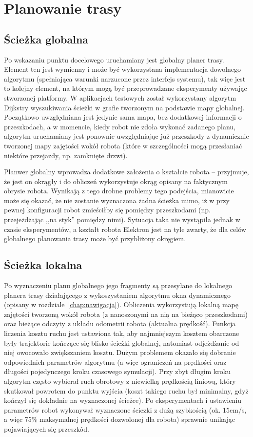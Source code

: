 \section{Planowanie trasy}

\subsection{Ścieżka globalna}

Po wskazaniu punktu docelowego uruchamiany jest globalny planer trasy. Element ten
jest wymienny i może być wykorzystana implementacja dowolnego algorytmu (spełniająca
warunki narzucone przez interfejs systemu), tak więc jest to kolejny element, na którym
mogą być przeprowadzane eksperymenty używając stworzonej platformy. W aplikacjach
testowych został wykorzystany algorytm Dijkstry wyszukiwania ścieżki w grafie tworzonym
na podstawie mapy globalnej. Początkowo uwzględniana jest jedynie sama mapa, bez
dodatkowej informacji o przeszkodach, a w momencie, kiedy robot nie zdoła wykonać
zadanego planu, algorytm uruchamiany jest ponownie uwzględniając już przeszkody
z dynamicznie tworzonej mapy zajętości wokół robota (które w szczególności mogą
przesłaniać niektóre przejazdy, np. zamknięte drzwi).

Planwer globalny wprowadza dodatkowe założenia o kształcie robota -- przyjmuje, że
jest on okrągły i do obliczeń wykorzystuje okrąg opisany na faktycznym obrysie robota.
Wynikają z tego drobne problemy tego podejścia, mianowicie może się okazać, że nie
zostanie wyznaczona żadna ścieżka mimo, iż w przy pewnej konfiguracji robot zmieściłby
się pomiędzy przeszkodami (np. przejeżdżając ,,na styk'' pomiędzy nimi). Sytuacja
taka nie wystąpiła jednak w czasie eksperymentów, a kształt robota Elektron jest
na tyle zwarty, że dla celów globalnego planowania trasy może być przybliżony okręgiem.

\subsection{Ścieżka lokalna}

Po wyznaczeniu planu globalnego jego fragmenty są przesyłane do lokalnego planera
trasy działającego z wykoszystaniem algorytmu okna dynamicznego (opisany w
rozdziale~\ref{chap:nawigacja}). Obliczenia wykorzystują lokalną mapę zajętości
tworzoną wokół robota (z nanoszonymi na nią na bieżąco przeszkodami) oraz
bieżące odczyty z układu odometrii robota (aktualna prędkość).
Funkcja liczenia kosztu ruchu jest ustawiona tak,
aby najmniejszym kosztem obarczone były trajektorie kończące się blisko ścieżki globalnej,
natomiast odjeżdżanie od niej owocowało zwiększaniem kosztu. Dużym problemem okazało
się dobranie odpowiednich parametrów algorytmu (a więc ograniczeń na prędkości
oraz długości pojedynczego kroku czasowego symulacji). Przy zbyt długim kroku
algorytm często wybierał ruch obrotowy z niewielką prędkością liniową, który skutkował
powrotem do punktu wyjścia (koszt takiego ruchu był minimalny, gdyż kończył się dokładnie
na wyznaczonej ścieżce). Po eksperymentach i ustawieniu parametrów robot wykonywał
wyznaczone ściezki z dużą szybkością (ok. 15cm/s, a więc 75\% maksymalnej prędkości
dozwolonej dla robota) sprawnie unikając pojawiających się przeszkód.
